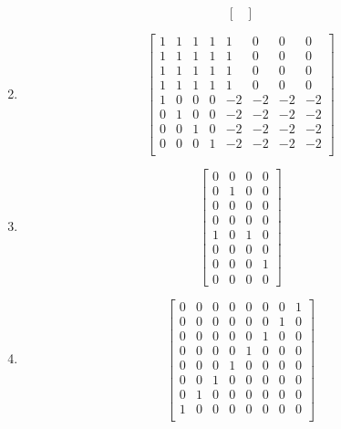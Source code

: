\documentclass{article}
\theoremstyle{remark}
\begin{document}
\begin{enumerate}
\begin{displaymath}
\begin{bmatrix}
    \end{bmatrix}
  \end{displaymath}
\item
  \begin{displaymath}
    \begin{bmatrix}
      1 & 1 & 1 & 1 & 1 & 0 & 0 & 0 \\
      1 & 1 & 1 & 1 & 1 & 0 & 0 & 0 \\
      1 & 1 & 1 & 1 & 1 & 0 & 0 & 0 \\
      1 & 1 & 1 & 1 & 1 & 0 & 0 & 0 \\
      1 & 0 & 0 & 0 & -2 & -2 & -2 & -2 \\
      0 & 1 & 0 & 0 & -2 & -2 & -2 & -2 \\
      0 & 0 & 1 & 0 & -2 & -2 & -2 & -2 \\
      0 & 0 & 0 & 1 & -2 & -2 & -2 & -2 \\
    \end{bmatrix}
  \end{displaymath}
\item
  \begin{displaymath}
    \begin{bmatrix}
      0 & 0 & 0 & 0 \\
      0 & 1 & 0 & 0 \\
      0 & 0 & 0 & 0 \\
      0 & 0 & 0 & 0 \\
      1 & 0 & 1 & 0 \\
      0 & 0 & 0 & 0 \\
      0 & 0 & 0 & 1 \\
      0 & 0 & 0 & 0
    \end{bmatrix}
  \end{displaymath}
\item
  \begin{displaymath}
    \begin{bmatrix}
      0 & 0 & 0 & 0 & 0 & 0 & 0 & 1 \\
      0 & 0 & 0 & 0 & 0 & 0 & 1 & 0 \\
      0 & 0 & 0 & 0 & 0 & 1 & 0 & 0 \\
      0 & 0 & 0 & 0 & 1 & 0 & 0 & 0 \\
      0 & 0 & 0 & 1 & 0 & 0 & 0 & 0 \\
      0 & 0 & 1 & 0 & 0 & 0 & 0 & 0 \\
      0 & 1 & 0 & 0 & 0 & 0 & 0 & 0 \\
      1 & 0 & 0 & 0 & 0 & 0 & 0 & 0 \\
    \end{bmatrix}

\end{displaymath}
\end{enumerate}
\end{document}
